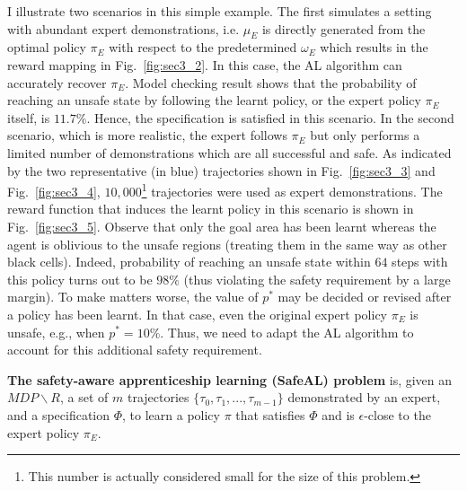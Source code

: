 I illustrate two scenarios in this simple example. The first simulates a setting with abundant expert demonstrations, i.e. $\mu_E$ is directly generated from the optimal policy $\pi_E$ with respect to the predetermined $\omega_E$ which results in the reward mapping in Fig.~\ref{fig:sec3_2}. In this case, the AL algorithm can accurately recover $\pi_E$. 
Model checking result shows that the probability of reaching an unsafe state by following the learnt policy, or the expert policy $\pi_E$ itself, is $11.7\%$. Hence, the specification is satisfied in this scenario. In the second scenario, which is more realistic, the expert follows $\pi_E$ but only performs a limited number of demonstrations which are all successful and safe. As indicated by the two representative (in blue) trajectories shown in Fig.~\ref{fig:sec3_3} and Fig.~\ref{fig:sec3_4}, $10,000$\footnote{This number is actually considered small for the size of this problem.} trajectories were used as expert demonstrations. 
The reward function that induces the learnt policy in this scenario is shown in Fig.~{\ref{fig:sec3_5}}.
Observe that only the goal area has been learnt whereas the agent is oblivious to the unsafe regions (treating them in the same way as other black cells). Indeed, probability of reaching an unsafe state within $64$ steps with this policy turns out to be $98\%$ (thus violating the safety requirement by a large margin).  
To make matters worse, the value of $p^*$ may be decided or revised after a policy has been learnt. In that case, even the original expert policy $\pi_E$ is unsafe, e.g., when $p^*=10\%$. 
Thus, we need to adapt the AL algorithm to account for this additional safety requirement. 
\begin{definition}
\textbf{The safety-aware apprenticeship learning (SafeAL) problem} is, given an $MDP\backslash R$, a set of $m$ trajectories $\{\tau_0, \tau_1, ..., \tau_{m-1}\}$ demonstrated by an expert, and a specification $\Phi$, to learn a policy $\pi$ that satisfies $\Phi$ and is $\epsilon$-close to the expert policy $\pi_E$.
\end{definition}
